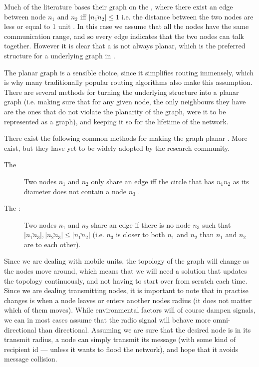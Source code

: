 \documentclass[letter, 12pt, english, draft]{article}
\begin{document}
Much of the literature bases their graph on the \udg, where there exist an edge between node $n_1$ and $n_2$ iff $|\overline{n_1n_2}| \leq 1$ i.e. the distance between the two nodes are less or equal to 1 unit  \cite{gopher}. In this case we assume that all the nodes have the same communication range, and so every edge indicates that the two nodes can talk together. However it is clear that a \udg is not always planar, which is the preferred structure for a underlying graph in \anet. 

The planar graph is a sensible choice, since it simplifies routing immensely, which is why many traditionally popular routing algorithms also make this assumption. There are several methods for turning the underlying structure into a planar graph (i.e. making sure that for any given node, the only neighbours they have are the ones that do not violate the planarity of the graph, were it to be represented as a graph), and keeping it so for the lifetime of the network. 

There exist the following common methods for making the graph planar . More exist, but they have yet to be widely adopted by the research community.
\begin{description}
\item[The \gabe] Two nodes $n_1$ and $n_2$ only share an edge iff the circle that has $\overline{n_1n_2}$ as its diameter does not contain a node $n_3$ \cite{gopher}. 
\item[The \rng:] Two nodes $n_1$ and $n_2$ share an edge if there is no node $n_3$ such that $|\overline{n_1n_3}|, |\overline{n_2n_3}| \leq |\overline{n_1n_2}|$ (i.e. $n_3$ is closer to both $n_1$ and $n_2$ than $n_1$ and $n_2$ are to each other).
\end{description}

Since we are dealing with mobile units, the topology of the graph will change as the nodes move around, which means that we will need a solution that updates the topology continuously, and not having to start over from scratch each time. Since we are dealing transmitting nodes, it is important to note that in practise changes is when a node leaves or enters another nodes radius (it does not matter which of them moves). While environmental factors will of course dampen signals, we can in most cases assume that the radio signal will behave more omni-directional than directional. Assuming we are sure that the desired node is in its transmit radius, a node can simply transmit its message (with some kind of recipient id --- unless it wants to flood the network), and hope that it avoids message collision.   
\end{document}
